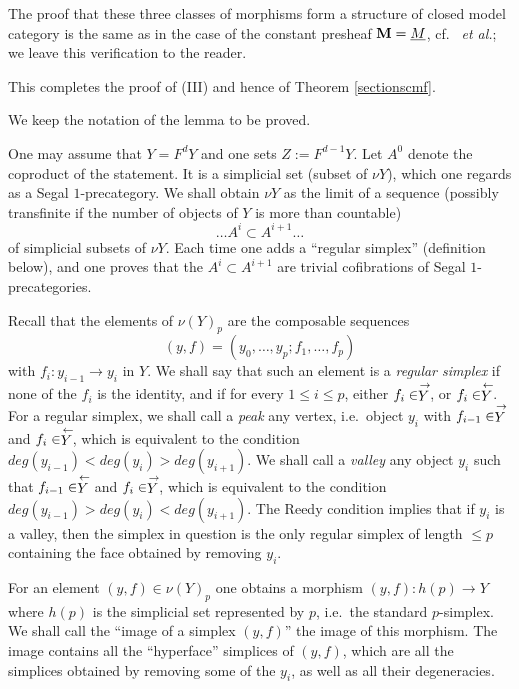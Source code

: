 The proof that these three classes of morphisms form a structure of
closed model
category is the same as in the case of the constant presheaf
${\bf M} =\underline{M}$, cf.\ \cite{Reedy} \cite{Hirschhorn} {\em et al.};
we leave this verification to the reader.

This completes the proof of (III) and hence of Theorem
\ref{sectionscmf}.
\eop


We keep the notation of the lemma to be proved.

One may assume that $Y=F^dY$ and one sets $Z:= F^{d-1}Y$. Let $A^0$ denote the
coproduct of the statement. It is a simplicial set
(subset of $\nu Y$), which one regards as a Segal $1$-precategory. We shall
obtain $\nu Y$ as the limit of a sequence (possibly transfinite if the number
of objects of $Y$ is more than countable)
$$
\ldots A^i\subset A^{i+1}\ldots
$$
of simplicial subsets of $\nu Y$. Each time one adds a
``regular simplex'' (definition below), and one proves that the
$A^i\subset A^{i+1}$ are trivial cofibrations of Segal $1$-precategories.

Recall that the elements of $\nu (Y)_p$ are the composable sequences
$$
(y,f) =(y_0,\ldots , y_p; f_1,\ldots , f_p)
$$
with $f_i:
y_{i-1}\rightarrow y_i$ in $Y$. We shall say that such an element is a {\em
regular simplex} if none of the $f_i$ is the identity, and if for every
$1\leq i \leq p$, either $f_i \in \stackrel{\rightarrow}{Y}$, or $f_i \in \stackrel{\leftarrow}{Y}$.
For a regular simplex, we shall call a {\em peak} any vertex, i.e.\ object
$y_i$ with $f_{i-1}\in \stackrel{\rightarrow}{Y}$ and $f_i\in \stackrel{\leftarrow}{Y}$, which is
equivalent
to the condition $deg(y_{i-1}) < deg(y_i) > deg(y_{i+1})$. We shall call a {\em
valley} any object $y_i$ such that $f_{i-1}\in \stackrel{\leftarrow}{Y}$ and $f_i\in
\stackrel{\rightarrow}{Y}$, which is equivalent to the condition $deg(y_{i-1}) > deg(y_i) <
deg(y_{i+1})$. The Reedy condition implies that if $y_i$ is a valley,
then the simplex in question is the only regular simplex of length $\leq
p$ containing the face obtained by removing $y_i$.

For an element $(y,f)\in \nu (Y)_p$ one obtains a morphism
$(y,f):h(p)\rightarrow Y$ where $h(p)$ is the simplicial set represented
by $p$, i.e.\ the standard $p$-simplex.
We shall call the ``image of a simplex $(y,f)$'' the image
of this morphism.
The image contains
all the ``hyperface'' simplices of $(y,f)$, which are all the simplices
obtained by removing some of the $y_i$, as well as all their
degeneracies.

